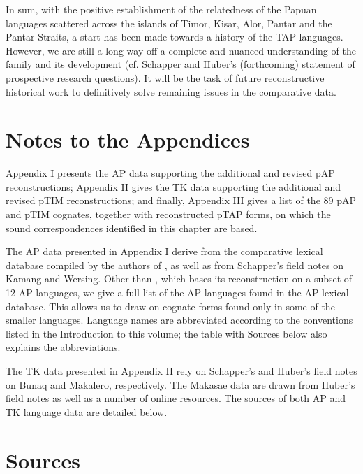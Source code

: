In sum, with the positive establishment of the relatedness of the Papuan languages scattered across the islands of Timor, Kisar, Alor, Pantar and the Pantar Straits, a start has been made towards a history of the TAP languages. However, we are still a long way off a complete and nuanced understanding of the family and its development (cf. Schapper and Huber's (forthcoming) statement of prospective research questions). It will be the task of future reconstructive historical work to definitively solve remaining issues in the comparative data.


\section{Notes to the Appendices}
Appendix I presents the AP data supporting the additional and revised pAP reconstructions; Appendix II gives the TK data supporting the additional and revised pTIM reconstructions; and finally, Appendix III gives a list of the 89 pAP and pTIM cognates, together with reconstructed pTAP forms, on which the sound correspondences identified in this chapter are based.

The AP data presented in Appendix I derive from the comparative lexical database compiled by the authors of \citet{HoltonEtAl2012}, as well as from Schapper's field notes on Kamang and Wersing. Other than \citet{HoltonEtAl2012}, which bases its reconstruction on a subset of 12 AP languages, we give a full list of the AP languages found in the AP lexical database. This allows us to draw on cognate forms found only in some of the smaller languages. Language names are abbreviated according to the conventions listed in the Introduction to this volume; the table with Sources below also explains the abbreviations.

The TK data presented in Appendix II rely on Schapper's and Huber's field notes on Bunaq and Makalero, respectively. The Makasae data are drawn from Huber's field notes as well as a number of online resources. The sources of both AP and TK language data are detailed below.

\section{Sources}



